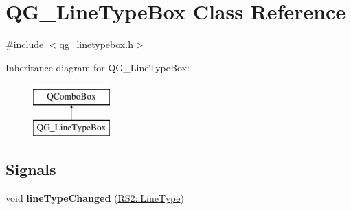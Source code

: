 \hypertarget{classQG__LineTypeBox}{\section{Q\-G\-\_\-\-Line\-Type\-Box Class Reference}
\label{classQG__LineTypeBox}
}


{\ttfamily \#include $<$qg\-\_\-linetypebox.\-h$>$}

Inheritance diagram for Q\-G\-\_\-\-Line\-Type\-Box\-:\begin{figure}[H]
\begin{center}
\leavevmode
\includegraphics[height=2.000000cm]{classQG__LineTypeBox}
\end{center}
\end{figure}
\subsection*{Signals}
\begin{DoxyCompactItemize}
\item 
\hypertarget{classQG__LineTypeBox_aef8dfbaeadcb614df756409118702d98}{void {\bfseries line\-Type\-Changed} (\hyperlink{classRS2_a6f3a82972c2d62456f6cacb74e14c95f}{R\-S2\-::\-Line\-Type})}\label{classQG__LineTypeBox_aef8dfbaeadcb614df756409118702d98}

\end{DoxyCompactItemize}
